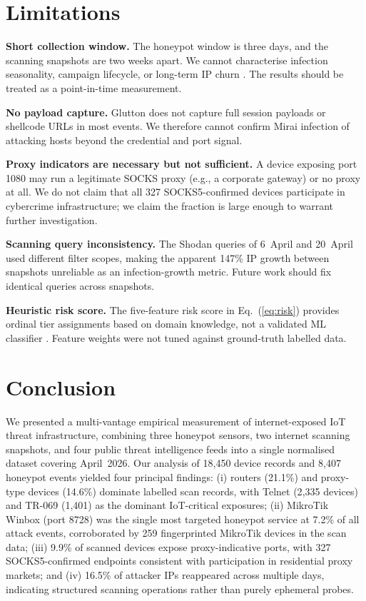 \documentclass[journal]{IEEEtran}
\begin{document}
\section{Limitations}
\label{sec:limitations}

\textbf{Short collection window.}
The honeypot window is three days, and the scanning snapshots are two weeks
apart. We cannot characterise infection seasonality, campaign lifecycle, or
long-term IP churn \cite{paine2024seven}.
The results should be treated as a point-in-time measurement.

\textbf{No payload capture.}
Glutton does not capture full session payloads or shellcode URLs in most events.
We therefore cannot confirm Mirai infection of attacking hosts beyond the
credential and port signal.

\textbf{Proxy indicators are necessary but not sufficient.}
A device exposing port 1080 may run a legitimate SOCKS proxy (e.g., a
corporate gateway) or no proxy at all.
We do not claim that all 327 SOCKS5-confirmed devices participate in cybercrime
infrastructure; we claim the fraction is large enough to warrant further
investigation.

\textbf{Scanning query inconsistency.}
The Shodan queries of 6~April and 20~April used different filter scopes,
making the apparent 147\% IP growth between snapshots unreliable as an
infection-growth metric. Future work should fix identical queries across
snapshots.

\textbf{Heuristic risk score.}
The five-feature risk score in Eq.~(\ref{eq:risk}) provides ordinal tier
assignments based on domain knowledge, not a validated ML classifier
\cite{karim2023cybersecurity, sarhan2023towards}. Feature weights were not
tuned against ground-truth labelled data.


\section{Conclusion}
\label{sec:conclusion}

We presented a multi-vantage empirical measurement of internet-exposed IoT
threat infrastructure, combining three honeypot sensors, two internet scanning
snapshots, and four public threat intelligence feeds into a single normalised
dataset covering April~2026.
Our analysis of 18{,}450 device records and 8{,}407 honeypot events yielded four
principal findings:
(i) routers (21.1\%) and proxy-type devices (14.6\%) dominate labelled scan
records, with Telnet (2{,}335 devices) and TR-069 (1{,}401) as the dominant
IoT-critical exposures;
(ii) MikroTik Winbox (port 8728) was the single most targeted honeypot service
at 7.2\% of all attack events, corroborated by 259 fingerprinted MikroTik
devices in the scan data;
(iii) 9.9\% of scanned devices expose proxy-indicative ports, with
327 SOCKS5-confirmed endpoints consistent with participation in residential
proxy markets; and
(iv) 16.5\% of attacker IPs reappeared across multiple days, indicating
structured scanning operations rather than purely ephemeral probes.
\end{document}
